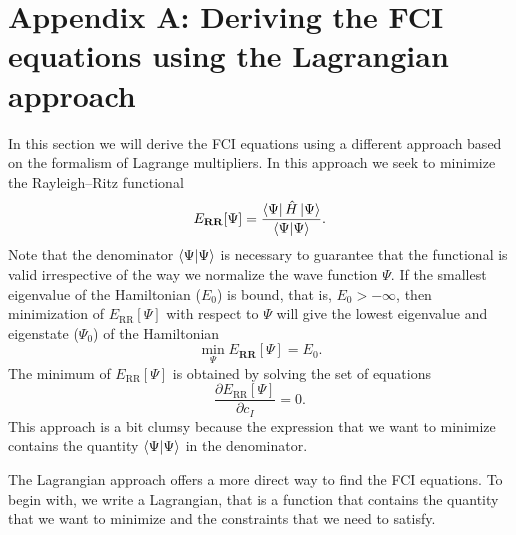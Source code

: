 \documentclass[../Main/chem532-notes.tex]{subfiles}
\begin{document}
\section*{Appendix A: Deriving the FCI equations using the Lagrangian approach}
In this section we will derive the FCI equations using a different approach based on the formalism of Lagrange multipliers.
In this approach we seek to minimize the Rayleigh--Ritz functional
\begin{equation}
E_\mathbf{RR}[\Psi] = \frac{\bra{\Psi} \hat{H} \ket{\Psi}}{\braket{\Psi|\Psi}}.
\end{equation}
Note that the denominator $\braket{\Psi|\Psi}$ is necessary to guarantee that the functional is valid irrespective of the way we normalize the wave function $\Psi$.
If the smallest eigenvalue of the Hamiltonian ($E_0$) is bound, that is, $E_0 > - \infty$, then minimization of $E_\mathrm{RR}[\Psi]$ with respect to $\Psi$ will give the lowest eigenvalue and eigenstate ($\Psi_0$) of the Hamiltonian 
\begin{equation}
\min_{\Psi} E_\mathbf{RR}[\Psi] = E_0.
\end{equation}
The minimum of $E_\mathrm{RR}[\Psi]$ is obtained by solving the set of equations
\begin{equation}
\frac{\partial E_\mathrm{RR}[\Psi]}{\partial c_I} = 0.
\end{equation}
This approach is a bit clumsy because the expression that we want to minimize contains the quantity $\braket{\Psi|\Psi}$ in the denominator.

The Lagrangian approach offers a more direct way to find the FCI equations.
To begin with, we write a Lagrangian, that is a function that contains the quantity that we want to minimize and the constraints that we need to satisfy.
\end{document}
